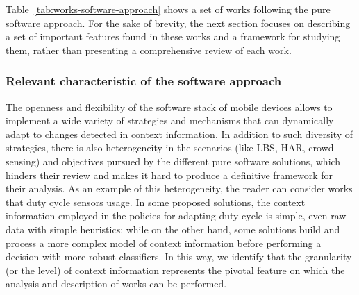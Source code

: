 \documentclass[ENG,PhD]{cinvestav}
\begin{document}
Table~\ref{tab:works-software-approach} shows a set of works following the pure software approach.
For the sake of brevity, the next section focuses on describing a set of important features found in these works and a framework for studying them, rather than presenting a comprehensive review of each work.

\subsubsection{Relevant characteristic of the software approach}
The openness and flexibility of the software stack of mobile devices allows to implement a wide variety of strategies and mechanisms that can dynamically adapt to changes detected in context information.
In addition to such diversity of strategies, there is also heterogeneity in the scenarios (like LBS, HAR, crowd sensing) and objectives pursued by the different pure software solutions, which hinders their review and makes it hard to produce a definitive framework for their analysis.
As an example of this heterogeneity, the reader can consider works that duty cycle sensors usage.
In some proposed solutions, the context information employed in the policies for adapting duty cycle is simple, even raw data with simple heuristics; while on the other hand, some solutions build and process a more complex model of context information before performing a decision with more robust classifiers.
In this way, we identify that the granularity (or the level) of context information represents the pivotal feature on which the analysis and description of works can be performed.
\end{document}
